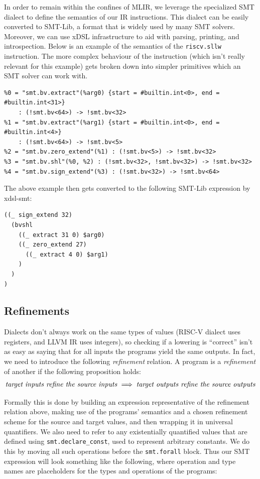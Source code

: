 In order to remain within the confines of MLIR, we leverage the specialized SMT dialect 
\cite{smt-mlir} to define the semantics of our IR instructions. This dialect can be 
easily converted to SMT-Lib, a format that is widely used by many SMT solvers. Moreover,
we can use xDSL infrastructure to aid with parsing, printing, and introspection. 
%
Below is an example of the semantics of the \texttt{riscv.sllw} instruction. The more complex
behaviour of the instruction (which isn't really relevant for this example) gets broken down 
into simpler primitives which an SMT solver can work with.
\begin{verbatim}
%0 = "smt.bv.extract"(%arg0) {start = #builtin.int<0>, end = #builtin.int<31>} 
    : (!smt.bv<64>) -> !smt.bv<32>
%1 = "smt.bv.extract"(%arg1) {start = #builtin.int<0>, end = #builtin.int<4>} 
    : (!smt.bv<64>) -> !smt.bv<5>
%2 = "smt.bv.zero_extend"(%1) : (!smt.bv<5>) -> !smt.bv<32>
%3 = "smt.bv.shl"(%0, %2) : (!smt.bv<32>, !smt.bv<32>) -> !smt.bv<32>
%4 = "smt.bv.sign_extend"(%3) : (!smt.bv<32>) -> !smt.bv<64>
\end{verbatim}

\noindent The above example then gets converted to the following SMT-Lib expression by xdsl-smt:
\begin{verbatim}
((_ sign_extend 32) 
  (bvshl 
    ((_ extract 31 0) $arg0) 
    ((_ zero_extend 27) 
      ((_ extract 4 0) $arg1)
    )
  )
)
\end{verbatim}

\subsection{Refinements}

\label{prep-refinements}

Dialects don't always work on the same types of values (RISC-V dialect uses registers, and LLVM IR 
uses integers), so checking if a lowering is ``correct'' isn't as easy as saying that for all inputs
the programs yield the same outputs. In fact, we need to introduce the following \emph{refinement}
relation. A program is a \emph{refinement} of another if the following proposition holds:
\begin{equation*}
\text{\emph{target inputs refine the source inputs}} \implies \text{\emph{target outputs refine the source outputs}}
\end{equation*}

Formally this is done by building an expression representative of the refinement relation above, 
making use of the programs' semantics and a chosen refinement scheme for the source and target values,
and then wrapping it in universal quantifiers. 
We also need to refer to any existentially quantified values that are defined using 
\texttt{smt.declare\_const}, used to represent arbitrary constants. 
We do this by moving all such operations before the \texttt{smt.forall} block.
%
Thus our SMT expression will look something like the following, where operation and type names are
placeholders for the types and operations of the programs:


